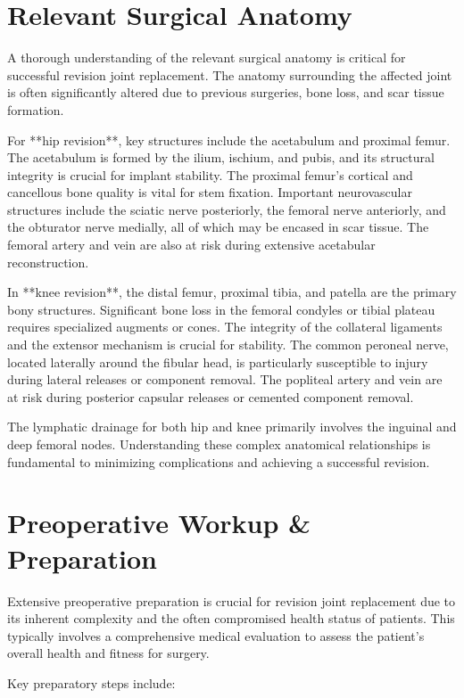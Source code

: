 \section*{Relevant Surgical Anatomy}
A thorough understanding of the relevant surgical anatomy is critical for successful revision joint replacement. The anatomy surrounding the affected joint is often significantly altered due to previous surgeries, bone loss, and scar tissue formation. 

For **hip revision**, key structures include the acetabulum and proximal femur. The acetabulum is formed by the ilium, ischium, and pubis, and its structural integrity is crucial for implant stability. The proximal femur's cortical and cancellous bone quality is vital for stem fixation. Important neurovascular structures include the sciatic nerve posteriorly, the femoral nerve anteriorly, and the obturator nerve medially, all of which may be encased in scar tissue. The femoral artery and vein are also at risk during extensive acetabular reconstruction.

In **knee revision**, the distal femur, proximal tibia, and patella are the primary bony structures. Significant bone loss in the femoral condyles or tibial plateau requires specialized augments or cones. The integrity of the collateral ligaments and the extensor mechanism is crucial for stability. The common peroneal nerve, located laterally around the fibular head, is particularly susceptible to injury during lateral releases or component removal. The popliteal artery and vein are at risk during posterior capsular releases or cemented component removal. 

The lymphatic drainage for both hip and knee primarily involves the inguinal and deep femoral nodes. Understanding these complex anatomical relationships is fundamental to minimizing complications and achieving a successful revision.

\section*{Preoperative Workup \& Preparation}
Extensive preoperative preparation is crucial for revision joint replacement due to its inherent complexity and the often compromised health status of patients. This typically involves a comprehensive medical evaluation to assess the patient's overall health and fitness for surgery.

Key preparatory steps include:

